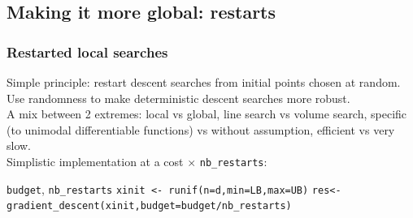 \documentclass[12pt]{beamer}
\begin{document}
\subsection{Making it more global: restarts}

\begin{frame}
\frametitle{Restarted local searches} 
Simple principle: restart descent searches from initial points chosen at random.\\
Use randomness to make deterministic descent searches more robust.\\
A mix between 2 extremes: local vs global, line search vs volume search, specific (to unimodal differentiable 
functions) vs without assumption, efficient vs very slow.\\
Simplistic implementation 
at a cost $\times$ \texttt{nb\_restarts}:
\vspace{-0.4cm}
\begin{center}
\begin{minipage}[t]{\textwidth}
\begin{algorithmic}
\REQUIRE \texttt{budget}, \texttt{nb\_restarts}
\STATE \texttt{xinit <- runif(n=d,min=LB,max=UB)}
\STATE \texttt{res<-gradient\_descent(xinit,budget=budget/nb\_restarts)}
\ENDFOR
\end{algorithmic}
\end{minipage}
\end{center}
\end{frame}
\end{document}
